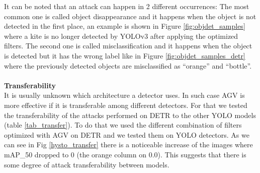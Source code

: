 It can be noted that an attack can happen in 2 different occurrences:
The most common one is called object disappearance and it happens when the object is not detected in the first place, an example is shown in Figure \ref{fig:objdet_samples} where a kite is no longer detected by YOLOv3 after applying the optimized filters.
The second one is called misclassification and it happens when the object is detected but it has the wrong label like in Figure \ref{fig:objdet_samples_detr} where the previously detected objects are misclassified as “orange” and “bottle”.\\ \\
\noindent\textbf{Transferability} \\
It is usually unknown which architecture a detector uses.
In such case AGV is more effective if it is transferable among different detectors.
For that we tested the transferability of the attacks performed on DETR to the other YOLO models (table \ref{tab_transfer}).
To do that we used the different combination of filters optimized with AGV on DETR and we tested them on YOLO detectors.
As we can see in Fig \ref{hysto_transfer} there is a noticeable increase of the images where mAP\_50 dropped to 0 (the orange column on 0.0).
This suggests that there is some degree of attack transferability between models.

